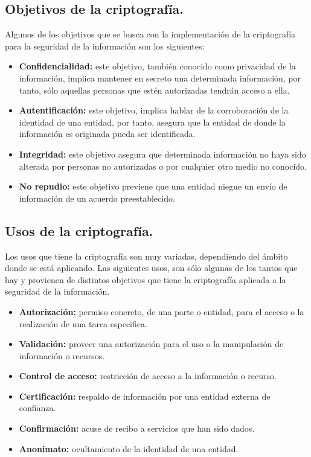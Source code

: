 \documentclass[12pt, a4paper, titlepage]{report}
\begin{document}
            \subsection{Objetivos de la criptografía.}
                Algunos de los objetivos que se busca con la implementación de la criptografía para la seguridad de la información son los siguientes:
                \begin{itemize}
                    \item \textbf{Confidencialidad:} este objetivo, también conocido como privacidad de la información, implica mantener en secreto una determinada información, por tanto, sólo aquellas personas que estén autorizadas tendrán acceso a ella.
                    \item \textbf{Autentificación:} este objetivo, implica hablar de la corroboración de la identidad de una entidad, por tanto, asegura que la entidad de donde la información es originada pueda ser identificada.
                    \item \textbf{Integridad:} este objetivo asegura que determinada información no haya sido alterada por personas no autorizadas o por cualquier otro medio no conocido.
                    \item \textbf{No repudio:} este objetivo previene que una entidad niegue un envío de información de un acuerdo preestablecido.
                \end{itemize}
            \subsection{Usos de la criptografía.}
                Los usos que tiene la criptografía son muy variadas, dependiendo del ámbito donde se está aplicando. Las siguientes usos, son sólo algunas de los tantos que hay y provienen de distintos objetivos que tiene la criptografía aplicada a la seguridad de la información. \cite{refCriptografia}
                \begin{itemize}
                    \item \textbf{Autorización:} permiso concreto, de una parte o entidad, para el acceso o la realización de una tarea especifica.
                    \item \textbf{Validación:} proveer una autorización para el uso o la manipulación de información o recursos.
                    \item \textbf{Control de acceso:} restricción de acceso a la información o recurso.
                    \item \textbf{Certificación:} respaldo de información por una entidad externa de confianza.
                    \item \textbf{Confirmación:} acuse de recibo a servicios que han sido dados.
                    \item \textbf{Anonimato:} ocultamiento de la identidad de una entidad.
                \end{itemize}
                
\end{document}
